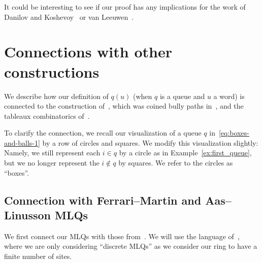 \documentclass[reqno]{amsart}
\newcommand{\0}{\phantom{c}}
\theoremstyle{plain}
\theoremstyle{definition}
\numberwithin{equation}{section}
\begin{document}
It could be interesting to see if our proof has any implications for the work of Danilov and Koshevoy~\cite{DanilovKoshevoy} or van Leeuwen~\cite{vanLeeuwen-dc}.






\appendix

\section{Connections with other constructions}
\label{app:queue-relations}

We describe how our definition of $q(u)$ (when $q$ is a queue and $u$ a word) is connected to the construction of~\cite{FM07}, which was coined bully paths in~\cite{AasLin17}, and the tableaux combinatorics of~\cite{AssSea18}.

To clarify the connection, we recall our visualization of a queue $q$ in~\eqref{eq:boxes-and-balls-1} by a row of circles and squares.
We modify this visualization slightly:
Namely, we still represent each $i \in q$ by a circle as in Example~\ref{ex:first_queue}, but we no longer represent the $i \notin q$ by squares.
We refer to the circles as ``boxes''.

\subsection{Connection with Ferrari--Martin and Aas--Linusson MLQs}

We first connect our MLQs with those from~\cite{FM07}.
We will use the language of~\cite{AasLin17}, where we are only considering ``discrete MLQs'' as we consider our ring to have a finite number of sites.
\end{document}
